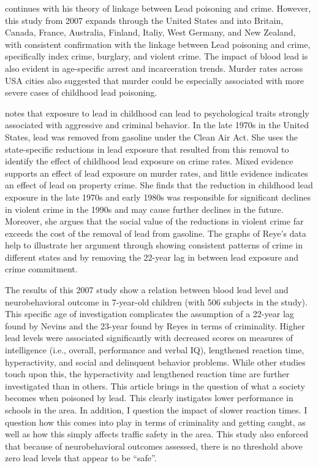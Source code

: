 \documentclass{article}\usepackage[]{graphicx}\usepackage[]{color}
\begin{document}
{\noindent {}

\cite{nevin_2007} continues with his theory of linkage between Lead poisoning and crime. However, this study from 2007 expands through the United States and into Britain, Canada, France, Australia, Finland, Italiy, West Germany, and New Zealand, with consistent confirmation with the linkage between Lead poisoning and crime, specifically index crime, burglary, and violent crime. The impact of blood lead is also evident in age-specific arrest and incarceration trends. Murder rates across USA cities also suggested that murder could be especially associated with more severe cases of childhood lead poisoning.

\noindent {}
\cite{reyes_2007} notes that exposure to lead in childhood can lead to psychological traits strongly associated with aggressive and criminal behavior. In the late 1970s in the United States, lead was removed from gasoline under the Clean Air Act. She uses the state-specific reductions in lead exposure that resulted from this removal to identify the effect of childhood lead exposure on crime rates. Mixed evidence supports an effect of lead exposure on murder rates, and little evidence indicates an effect of lead on property crime. She finds that the reduction in childhood lead exposure in the late 1970s and early 1980s was responsible for significant declines in violent crime in the 1990s and may cause further declines in the future. Moreover, she argues that the social value of the reductions in violent crime far exceeds the cost of the removal of lead from gasoline. The graphs of Reye’s data help to illustrate her argument through showing consistent patterns of crime in different states and by removing the 22-year lag in between lead exposure and crime commitment. 


\noindent {}

The results of this 2007 study show a relation between blood lead level and neurobehavioral outcome in 7-year-old children (with 506 subjects  in the study). This specific age of investigation complicates the assumption of a 22-year lag found by Nevins and the 23-year found by Reyes in terms of criminality. Higher lead levels were associated significantly with decreased scores on measures of intelligence (i.e., overall, performance and verbal IQ), lengthened reaction time, hyperactivity, and social and delinquent behavior problems. While other studies touch upon this, the hyperactivity and lengthened reaction time are further investigated than in others. This article brings in the question of what a society becomes when poisoned by lead. This clearly instigates lower performance in schools in the area. In addition, I question the impact of slower reaction times. I question how this comes into play in terms of criminality and getting caught, as well as how this simply affects traffic safety in the area. This study also enforced that because of neurobehavioral outcomes assessed, there is no threshold above zero lead levels that appear to be “safe”. 

}
\end{document}
